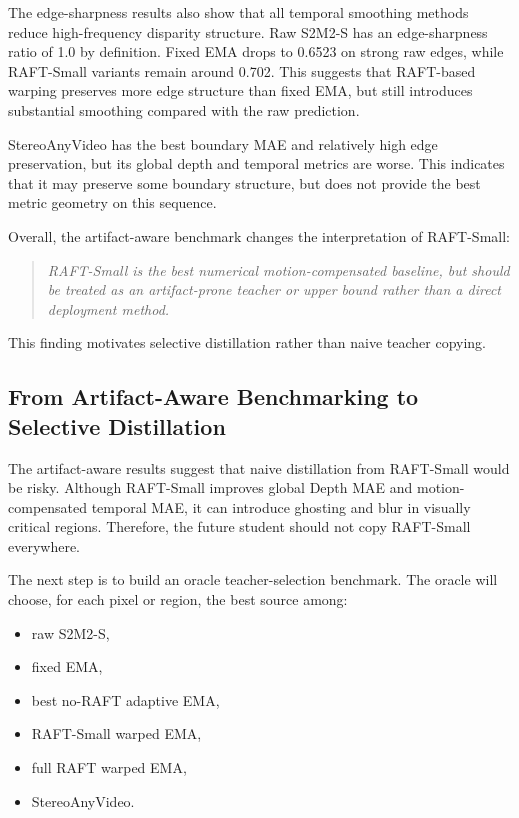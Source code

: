 \documentclass[11pt,a4paper]{article}
\begin{document}
The edge-sharpness results also show that all temporal smoothing methods reduce high-frequency disparity structure. Raw S2M2-S has an edge-sharpness ratio of 1.0 by definition. Fixed EMA drops to 0.6523 on strong raw edges, while RAFT-Small variants remain around 0.702. This suggests that RAFT-based warping preserves more edge structure than fixed EMA, but still introduces substantial smoothing compared with the raw prediction.

StereoAnyVideo has the best boundary MAE and relatively high edge preservation, but its global depth and temporal metrics are worse. This indicates that it may preserve some boundary structure, but does not provide the best metric geometry on this sequence.

Overall, the artifact-aware benchmark changes the interpretation of RAFT-Small:

\begin{quote}
\emph{RAFT-Small is the best numerical motion-compensated baseline, but should be treated as an artifact-prone teacher or upper bound rather than a direct deployment method.}
\end{quote}

This finding motivates selective distillation rather than naive teacher copying.

\subsection{From Artifact-Aware Benchmarking to Selective Distillation}

The artifact-aware results suggest that naive distillation from RAFT-Small would be risky. Although RAFT-Small improves global Depth MAE and motion-compensated temporal MAE, it can introduce ghosting and blur in visually critical regions. Therefore, the future student should not copy RAFT-Small everywhere.

The next step is to build an oracle teacher-selection benchmark. The oracle will choose, for each pixel or region, the best source among:

\begin{itemize}[leftmargin=*]
\item raw S2M2-S,
\item fixed EMA,
\item best no-RAFT adaptive EMA,
\item RAFT-Small warped EMA,
\item full RAFT warped EMA,
\item StereoAnyVideo.
\end{itemize}
\end{document}
